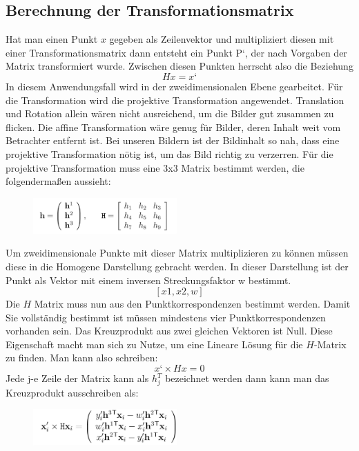 \subsection{Berechnung der Transformationsmatrix }
Hat man einen Punkt $x$ gegeben als Zeilenvektor und multipliziert diesen mit einer Transformationsmatrix dann entsteht ein Punkt P‘, der nach Vorgaben der Matrix transformiert wurde. Zwischen diesen Punkten herrscht also die Beziehung
				$$H x=x‘$$
In diesem Anwendungsfall wird in der zweidimensionalen Ebene gearbeitet. Für die Transformation wird die projektive Transformation angewendet. Translation und Rotation allein wären nicht ausreichend, um die Bilder gut zusammen zu flicken. Die affine Transformation wäre genug für Bilder, deren Inhalt weit vom Betrachter entfernt ist. Bei unseren Bildern ist der Bildinhalt so nah, dass eine projektive Transformation nötig ist, um das Bild richtig zu verzerren. Für die projektive Transformation muss eine 3x3 Matrix bestimmt werden, die folgendermaßen aussieht:

\begin{figure}[ht]
    \centering
    \includegraphics[width=0.49\textwidth]{FiguresIS/42.jpg}
    \caption{\cite{Richard2000} }
\end{figure}

Um zweidimensionale Punkte mit dieser Matrix multiplizieren zu können müssen diese in die Homogene Darstellung gebracht werden. In dieser Darstellung ist der Punkt als Vektor mit einem inversen Streckungsfaktor w bestimmt. 
				$$[x1, x2, w]$$
Die $H$ Matrix muss nun aus den Punktkorrespondenzen bestimmt werden. Damit Sie vollständig bestimmt ist müssen mindestens vier Punktkorrespondenzen vorhanden sein.
Das Kreuzprodukt aus zwei gleichen Vektoren ist Null. Diese Eigenschaft macht man sich zu Nutze, um eine Lineare Lösung für die $H$-Matrix zu finden. Man kann also schreiben:
			$$ x‘ \times H x=0$$
Jede j-e Zeile der Matrix kann als $h_j^T$ bezeichnet werden dann kann man das Kreuzprodukt ausschreiben als:

\begin{figure}[ht]
    \centering
    \includegraphics[width=0.49\textwidth]{FiguresIS/40.jpg}
    \caption{\cite{Richard2000}}
\end{figure}

